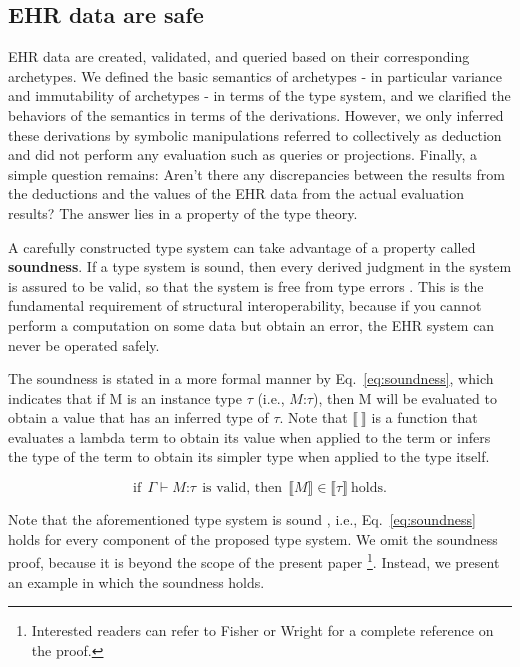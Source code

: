 \documentclass[preprint,3p,onecolumn,times,review]{article}
\begin{document}
{\subsection{EHR data are safe\label{sec:ehr_data_safety}}

EHR data are created, validated, and queried based on their corresponding archetypes. We defined the basic semantics of archetypes - in particular variance and immutability of archetypes -  in terms of the type system, and we clarified the behaviors of the semantics in terms of the derivations. However, we only inferred these derivations by symbolic manipulations referred to collectively as deduction and did not perform any evaluation such as queries or projections.
Finally, a simple question remains: Aren't there any discrepancies between the results from the deductions and the values of the EHR data from the actual evaluation results?
The answer lies in a property of the type theory.

A carefully constructed type system can take advantage of a property called {\bf soundness}.
If a type system is sound, then every derived judgment in the system is assured to be valid, so that the system is free from type errors \cite{mitchell00:_found_progr_languag,cardelli04:_type_system}.
This is the fundamental requirement of structural interoperability, because if you cannot perform a computation on some data but obtain an error, the EHR system can never be operated safely.

The soundness is stated in a more formal manner \cite[p.12]{cardelli04:_type_system} by Eq.~\ref{eq:soundness}, which indicates that if M is an instance type $\tau$ (i.e., $M\text{:}\tau$), then M will be evaluated to obtain a value that has an inferred type of $\tau$.
Note that $\llbracket {~} \rrbracket$ is a function that evaluates a lambda term to obtain its value when applied to the term or infers the type of the term to obtain its simpler type when applied to the type itself.

\begin{equation}
  \label{eq:soundness}
  \text{if} ~~ \Gamma \vdash M \text{:} \tau ~~\text{is valid, then}~~ \llbracket M \rrbracket \in \llbracket \tau \rrbracket ~\text{holds.}
\end{equation}

Note that the aforementioned type system is sound \cite{gunter92:_seman_progr_languag,wright94:_syntac_approac_to_type_sound}, i.e., Eq.~\ref{eq:soundness} holds for every component of the proposed type system. We omit the soundness proof, because it is beyond the scope of the present paper \footnote{Interested readers can refer to Fisher \cite{fisher94:_lambd_calcul_objec_method_special} or Wright \cite{wright94:_syntac_approac_to_type_sound} for a complete reference on the proof.}. Instead, we present an example in which the soundness holds.

}
\end{document}
